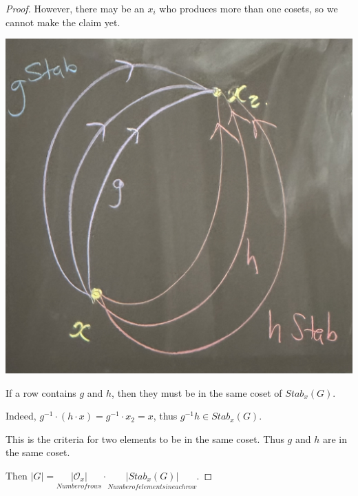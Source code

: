 \begin{proof}

    However, there may be an $x_i$ who produces more than one cosets, so we cannot make the claim yet.

    \begin{center}
        \includegraphics[width=0.2\linewidth]{figures/orbit-stabilizer-proof-2.jpg}
    \end{center}

    If a row contains $g$ and $h$, then they must be in the same coset of $Stab_x(G)$.

    Indeed, $g^{-1} \cdot (h \cdot x) = g^{-1} \cdot x_2 = x$, thus $g^{-1} h \in Stab_x(G)$.

    This is the criteria for two elements to be in the same coset. Thus $g$ and $h$ are in the same coset.

    Then $|G| = \underset{Number of rows}{| \mathcal{O}_x |} \cdot \underset{Number of elements in each row}{| Stab_x(G) |}$.
\end{proof}

